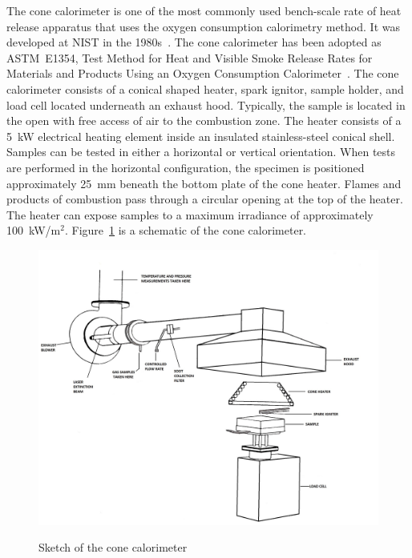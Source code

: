 \documentclass[twoside]{uocthesis}
\begin{document}
{The cone calorimeter is one of the most commonly used bench-scale rate of heat release apparatus that uses the oxygen consumption calorimetry method. It was developed at NIST in the 1980s~\cite{babrauskas:1984}. The cone calorimeter has been adopted as ASTM~E1354, Test Method for Heat and Visible Smoke Release Rates for Materials and Products Using an Oxygen Consumption Calorimeter~\cite{ASTM_E1354}. The cone calorimeter consists of a conical shaped heater, spark ignitor, sample holder, and load cell located underneath an exhaust hood. Typically, the sample is located in the open with free access of air to the combustion zone. The heater consists of a 5~kW electrical heating element inside an insulated stainless-steel conical shell. Samples can be tested in either a horizontal or vertical orientation. When tests are performed in the horizontal configuration, the specimen is positioned approximately 25~mm beneath the bottom plate of the cone heater. Flames and products of combustion pass through a circular opening at the top of the heater. The heater can expose samples to a maximum irradiance of approximately 100~kW/m$^2$. Figure~\ref{Cone_Cal} is a schematic of the cone calorimeter.

\begin{figure}
	\centering
	\includegraphics[width=\textwidth]{../Figures/Cone_Cal} \\
	\caption[Sketch of the cone calorimeter]{Sketch of the cone calorimeter}
	\label{Cone_Cal}
\end{figure}


}
\end{document}
